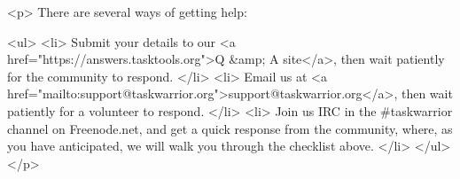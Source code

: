 \documentclass[t,handout]{beamer}
\begin{document}
<p>
  There are several ways of getting help:

  <ul>
    <li>
      Submit your details to our
      <a href="https://answers.tasktools.org">Q &amp; A site</a>,
      then wait patiently for the community to respond.
    </li>
    <li>
      Email us at
      <a href="mailto:support@taskwarrior.org">support@taskwarrior.org</a>,
      then wait patiently for a volunteer to respond.
    </li>
    <li>
      Join us IRC in the #taskwarrior channel on Freenode.net, and
      get a quick response from the community, where, as you have
      anticipated, we will walk you through the checklist above.
    </li>
  </ul>
</p>

\fi
\end{document}

